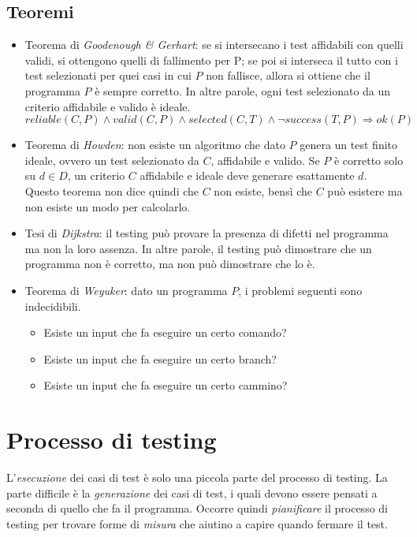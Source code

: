 \documentclass[a4paper,oneside,titlepage]{book}
\begin{document}
\subsection{Teoremi}
\begin{itemize}
    \item Teorema di \textit{Goodenough \& Gerhart}: se si intersecano i test affidabili con quelli validi, si ottengono quelli di fallimento per P; se poi si interseca il tutto con i test selezionati per quei casi in cui $P$ non fallisce, allora si ottiene che il programma $P$ è sempre corretto. In altre parole, ogni test selezionato da un criterio affidabile e valido è ideale.
    \[ reliable(C,P) \wedge valid(C,P) \wedge selected(C,T) \wedge \neg success(T,P) \Rightarrow ok(P) \]
    \item Teorema di \textit{Howden}: non esiste un algoritmo che dato $P$ genera un test finito ideale, ovvero un test selezionato da $C$, affidabile e valido. Se $P$ è corretto solo su $d \in D$, un criterio $C$ affidabile e ideale deve generare esattamente $d$. Questo teorema non dice quindi che $C$ non esiste, bensì che $C$ può esistere ma non esiste un modo per calcolarlo.
    \item Tesi di \textit{Dijkstra}: il testing può provare la presenza di difetti nel programma ma non la loro assenza. In altre parole, il testing può dimostrare che un programma non è corretto, ma non può dimostrare che lo è.
    \item Teorema di \textit{Weyuker}: dato un programma $P$, i problemi seguenti sono indecidibili.
    \begin{itemize}
        \item Esiste un input che fa eseguire un certo comando?
        \item Esiste un input che fa eseguire un certo branch?
        \item Esiste un input che fa eseguire un certo cammino?
    \end{itemize}
\end{itemize}


\section{Processo di testing} %
L'\textit{esecuzione} dei casi di test è solo una piccola parte del processo di testing. La parte difficile è la \textit{generazione} dei casi di test, i quali devono essere pensati a seconda di quello che fa il programma. Occorre quindi \textit{pianificare} il processo di testing per trovare forme di \textit{misura} che aiutino a capire quando fermare il test.
\end{document}
